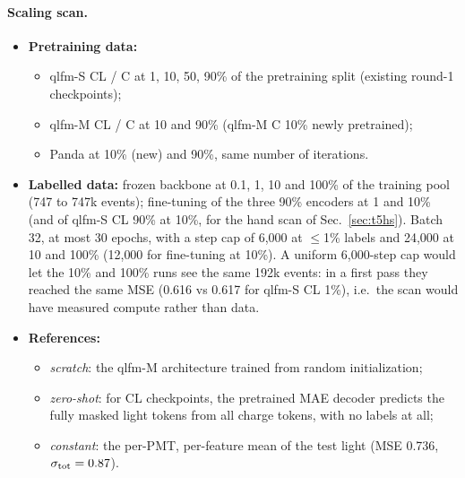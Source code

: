 \documentclass[11pt,a4paper]{article}
\begin{document}
\paragraph{Scaling scan.}
\begin{itemize}
  \item \textbf{Pretraining data:}
  \begin{itemize}
    \item qlfm-S CL / C at 1, 10, 50, 90\% of the pretraining split (existing round-1 checkpoints);
    \item qlfm-M CL / C at 10 and 90\% (qlfm-M C 10\% newly pretrained);
    \item Panda at 10\% (new) and 90\%, same number of iterations.
  \end{itemize}
  \item \textbf{Labelled data:} frozen backbone at 0.1, 1, 10 and 100\% of the training pool (747 to 747k events); fine-tuning of the three 90\% encoders at 1 and 10\% (and of qlfm-S CL 90\% at 10\%, for the hand scan of Sec.~\ref{sec:t5hs}). Batch 32, at most 30 epochs, with a step cap of 6{,}000 at $\leq$1\% labels and 24{,}000 at 10 and 100\% (12{,}000 for fine-tuning at 10\%). A uniform 6{,}000-step cap would let the 10\% and 100\% runs see the same 192k events: in a first pass they reached the same MSE (0.616 vs 0.617 for qlfm-S CL 1\%), i.e.\ the scan would have measured compute rather than data.
  \item \textbf{References:}
  \begin{itemize}
    \item \emph{scratch}: the qlfm-M architecture trained from random initialization;
    \item \emph{zero-shot}: for CL checkpoints, the pretrained MAE decoder predicts the fully masked light tokens from all charge tokens, with no labels at all;
    \item \emph{constant}: the per-PMT, per-feature mean of the test light (MSE 0.736, $\sigma_{\rm tot}=0.87$).
  \end{itemize}
\end{itemize}
\end{document}
